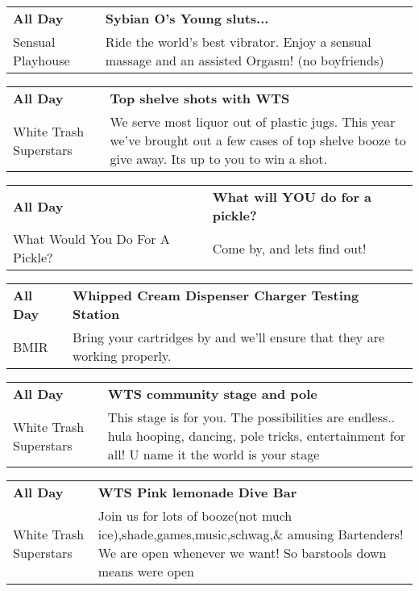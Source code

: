 \begin{tabular}{ p{1in} p{2.2in} }
    \textbf{All Day} & \textbf{Sybian O's Young sluts...} \\
    Sensual Playhouse \newline  & Ride the world's best vibrator. Enjoy a sensual massage and an assisted Orgasm! (no boyfriends) \\
    \hline 
\end{tabular}
    
\begin{tabular}{ p{1in} p{2.2in} }
    \textbf{All Day} & \textbf{Top shelve shots with WTS} \\
    White Trash Superstars \newline  & We serve most liquor out of plastic jugs. This year we've brought out a few cases of top shelve booze to give away. Its up to you to win a shot. \\
    \hline 
\end{tabular}
    
\begin{tabular}{ p{1in} p{2.2in} }
    \textbf{All Day} & \textbf{What will YOU do for a pickle?} \\
    What Would You Do For A Pickle? \newline  & Come by, and lets find out! \\
    \hline 
\end{tabular}
    
\begin{tabular}{ p{1in} p{2.2in} }
    \textbf{All Day} & \textbf{Whipped Cream Dispenser Charger Testing Station} \\
    BMIR \newline  & Bring your cartridges by and we'll ensure that they are working properly. \\
    \hline 
\end{tabular}
    
\begin{tabular}{ p{1in} p{2.2in} }
    \textbf{All Day} & \textbf{WTS community stage and pole} \\
    White Trash Superstars \newline  & This stage is for you. The possibilities are endless.. hula hooping,  dancing, pole tricks, entertainment for all! U name it the world is your stage \\
    \hline 
\end{tabular}
    
\begin{tabular}{ p{1in} p{2.2in} }
    \textbf{All Day} & \textbf{WTS Pink lemonade Dive Bar} \\
    White Trash Superstars \newline  & Join us for lots of booze(not much ice),shade,games,music,schwag,\& amusing Bartenders! We are open whenever we want! So barstools down means were open \\
    \hline 
\end{tabular}
    
